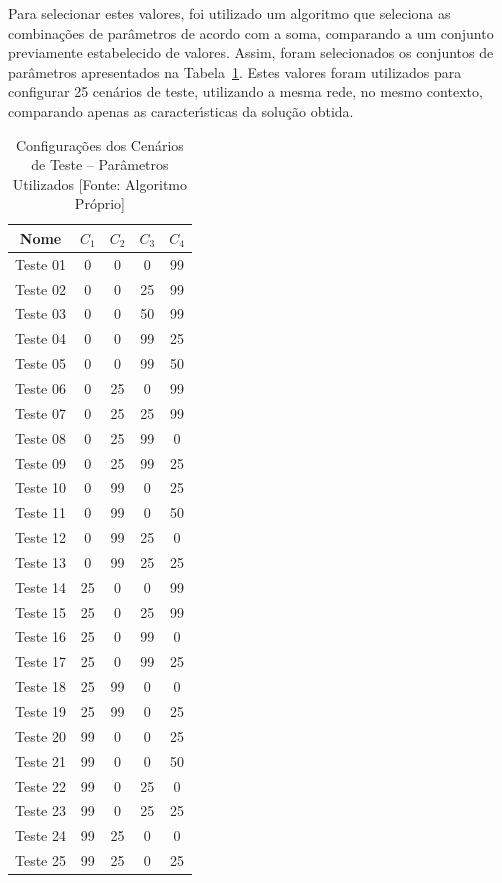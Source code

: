 Para selecionar estes valores, foi utilizado um  algoritmo que seleciona as combina{\c c}{\~o}es de par{\^a}metros de acordo com a soma, comparando a um conjunto previamente estabelecido de valores. Assim, foram selecionados os conjuntos de par{\^a}metros apresentados na Tabela~\ref{tab:cenarios}. Estes valores foram utilizados para configurar 25 cen{\'a}rios de teste, utilizando a mesma rede, no mesmo contexto, comparando apenas as caracter{\'\i}sticas da solu{\c c}{\~a}o obtida.

\begin{table}[!b]
	\begin{center}
		\caption[Configura{\c c}{\~o}es dos Cen{\'a}rios de Teste \--- Par{\^a}metros Utilizados]{Configura{\c c}{\~o}es dos Cen{\'a}rios de Teste \--- Par{\^a}metros Utilizados [Fonte: Algoritmo Pr{\'o}prio]}
		\label{tab:cenarios}
		\vspace{5pt}
		\begin{tabular}{c c c c c}
			\hline
			\textbf{Nome} & \textbf{$C_{1}$} & \textbf{$C_{2}$} & \textbf{$C_{3}$} & \textbf{$C_{4}$} \\
			\hline\hline
			Teste 01 & 0 & 0 & 0 & 99 \\
			Teste 02 & 0 & 0 & 25 & 99 \\
			Teste 03 & 0 & 0 & 50 & 99 \\
			Teste 04 & 0 & 0 & 99 & 25 \\
			Teste 05 & 0 & 0 & 99 & 50 \\
			Teste 06 & 0 & 25 & 0 & 99 \\
			Teste 07 & 0 & 25 & 25 & 99 \\
			Teste 08 & 0 & 25 & 99 & 0 \\
			Teste 09 & 0 & 25 & 99 & 25 \\
			Teste 10 & 0 & 99 & 0 & 25 \\
			Teste 11 & 0 & 99 & 0 & 50 \\
			Teste 12 & 0 & 99 & 25 & 0 \\
			Teste 13 & 0 & 99 & 25 & 25 \\
			Teste 14 & 25 & 0 & 0 & 99 \\
			Teste 15 & 25 & 0 & 25 & 99 \\
			Teste 16 & 25 & 0 & 99 & 0 \\
			Teste 17 & 25 & 0 & 99 & 25 \\
			Teste 18 & 25 & 99 & 0 & 0 \\
			Teste 19 & 25 & 99 & 0 & 25 \\
			Teste 20 & 99 & 0 & 0 & 25 \\
			Teste 21 & 99 & 0 & 0 & 50 \\
			Teste 22 & 99 & 0 & 25 & 0 \\
			Teste 23 & 99 & 0 & 25 & 25 \\
			Teste 24 & 99 & 25 & 0 & 0 \\
			Teste 25 & 99 & 25 & 0 & 25 \\
			\hline
		\end{tabular}
	\end{center}
\end{table}

